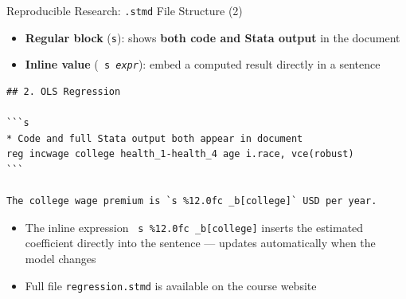 \documentclass[dvipsnames,hyperref={pdfpagelabels=false}]{beamer}
\begin{document}
\begin{frame}[fragile]{Reproducible Research: \texttt{.stmd} File Structure (2)}

	\begin{itemize}
		\item \textbf{Regular block} (\texttt{{\char96}{}{}s}): shows \textbf{both code and Stata output} in the document
		\vspace{0.2cm}
		\item \textbf{Inline value} (\texttt{{} s \textit{expr}{}}): embed a computed result directly in a sentence
	\end{itemize}

\begin{lstlisting}[language={},basicstyle=\ttfamily\fontsize{7.5}{9}\selectfont,keywordstyle={},breaklines=true,breakatwhitespace=true]
## 2. OLS Regression

```s
* Code and full Stata output both appear in document
reg incwage college health_1-health_4 age i.race, vce(robust)
```

The college wage premium is `s %12.0fc _b[college]` USD per year.
\end{lstlisting}

	\begin{itemize}
		\item The inline expression \texttt{{} s \%12.0fc \_b[college]{}} inserts the estimated coefficient directly into the sentence --- updates automatically when the model changes
		\vspace{0.1cm}
		\item Full file \texttt{regression.stmd} is available on the course website
	\end{itemize}

\end{frame}
\end{document}
